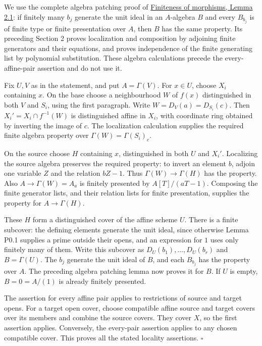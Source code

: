 \documentclass[11pt,a4paper,openany]{report}
\begin{document}
We use the complete algebra patching proof of \href{https://github.com/KokunoYumeto/open-math-courses/blob/d02d0a3669f42579db037cd44de1d113fdd770a1/docs/courses/AG-MO/src/finiteness-of-morphisms.md}{Finiteness of morphisms, Lemma 2.1}: if finitely many \(b_j\) generate the unit ideal in an \(A\)-algebra \(B\) and every \(B_{b_j}\) is of finite type or finite presentation over \(A\), then \(B\) has the same property. Its preceding Section 2 proves localization and composition by adjoining finite generators and their equations, and proves independence of the finite generating list by polynomial substitution. These algebra calculations precede the every-affine-pair assertion and do not use it.

Fix \(U,V\) as in the statement, and put \(A=\Gamma(V)\). For \(x\in U\), choose \(X_i\) containing \(x\). On the base choose a neighbourhood \(W\) of \(f(x)\) distinguished in both \(V\) and \(S_i\), using the first paragraph. Write \(W=D_V(a)=D_{S_i}(c)\). Then \(X_i'=X_i\cap f^{-1}(W)\) is distinguished affine in \(X_i\), with coordinate ring obtained by inverting the image of \(c\). The localization calculation supplies the required finite algebra property over \(\Gamma(W)=\Gamma(S_i)_c\).

On the source choose \(H\) containing \(x\), distinguished in both \(U\) and \(X_i'\). Localizing the source algebra preserves the required property: to invert an element \(b\), adjoin one variable \(Z\) and the relation \(bZ-1\). Thus \(\Gamma(W)\to\Gamma(H)\) has the property. Also \(A\to\Gamma(W)=A_a\) is finitely presented by \(A[T]/(aT-1)\). Composing the finite generator lists, and their relation lists for finite presentation, supplies the property for \(A\to\Gamma(H)\).

These \(H\) form a distinguished cover of the affine scheme \(U\). There is a finite subcover: the defining elements generate the unit ideal, since otherwise Lemma P0.1 supplies a prime outside their opens, and an expression for \(1\) uses only finitely many of them. Write this subcover as \(D_U(b_1),\ldots,D_U(b_r)\) and \(B=\Gamma(U)\). The \(b_j\) generate the unit ideal of \(B\), and each \(B_{b_j}\) has the property over \(A\). The preceding algebra patching lemma now proves it for \(B\). If \(U\) is empty, \(B=0=A/(1)\) is already finitely presented.

The assertion for every affine pair applies to restrictions of source and target opens. For a target open cover, choose compatible affine source and target covers over its members and combine the source covers. They cover \(X\), so the first assertion applies. Conversely, the every-pair assertion applies to any chosen compatible cover. This proves all the stated locality assertions. \(\square\)
\end{document}
